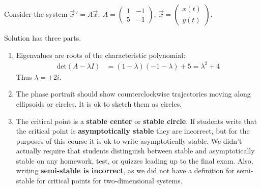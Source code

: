 \ifnum {}
\question[3] Consider the system $\displaystyle \vec x \, ' = A\vec x, \ A = \begin{pmatrix} 1&-1\\5&-1 \end{pmatrix}, \ \vec x = \begin{pmatrix} x(t)\\y(t)\end{pmatrix} $.
\ifnum {} {\color{DarkBlue} 
Solution has three parts.
\begin{enumerate}
    \item Eigenvalues are roots of the characteristic polynomial:
\begin{align}
    \text{det}\left(A - \lambda I\right) &= (1-\lambda)(-1- \lambda) + 5 =\lambda^2 + 4
\end{align}
Thus $\lambda = \pm 2i$. 
\item The phase portrait should show counterclockwise trajectories moving along ellipsoids or circles. It is ok to sketch them as circles. 
\item The critical point is a \textbf{stable center} or \textbf{stable circle}.  If students write that the critical point is \textbf{asymptotically stable} they are incorrect, but for the purposes of this course it is ok to write asymptotically stable. We didn't actually require that students distinguish between stable and asymptotically stable on any homework, test, or quizzes leading up to the final exam. Also, writing \textbf{semi-stable is incorrect}, as we did not have a definition for semi-stable for critical points for two-dimensional systems. 
\end{enumerate}


} 
\else 
\vspace{1cm}
\fi

